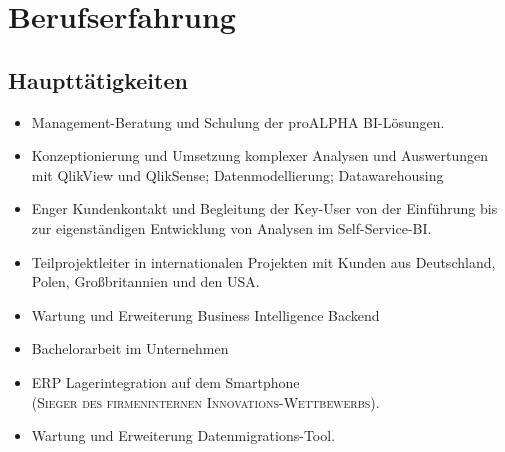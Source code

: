 %


%







\makecvtitle %

\section{Berufserfahrung}

\subsection{Hauptt\"atigkeiten}

{
	\begin{itemize}
		\item Management-Beratung und Schulung der proALPHA BI-L\"osungen. 
		\item Konzeptionierung und Umsetzung komplexer Analysen und Auswertungen mit QlikView und QlikSense; Datenmodellierung; Datawarehousing 
		\item Enger Kundenkontakt und Begleitung der Key-User von der Einf\"uhrung bis zur eigenst\"andigen Entwicklung von Analysen im Self-Service-BI. 
		\item Teilprojektleiter in internationalen Projekten mit Kunden aus Deutschland, Polen, Gro\ss britannien und den USA. 
	\end{itemize}}

{ 
	\begin{itemize} 
		\item Wartung und Erweiterung Business Intelligence Backend
		\item Bachelorarbeit im Unternehmen
		\item ERP Lagerintegration auf dem Smartphone\\ \textsc{(Sieger des firmeninternen Innovations-Wettbewerbs)}.
		\item Wartung und Erweiterung Datenmigrations-Tool. 
	\end{itemize}}

